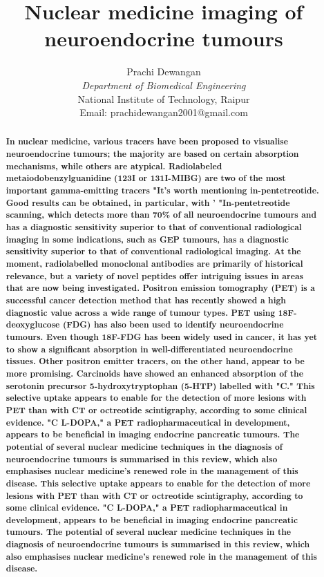 \documentclass{article}
\title{\textbf{Nuclear medicine imaging of neuroendocrine tumours}}
\author{Prachi Dewangan\\
\textit{Department of Biomedical Engineering} \\ National Institute of Technology, Raipur \\ Email: prachidewangan2001@gmail.com\\}
\date{}
\begin{document}
\maketitle
\begin{abstract}\textbf{In nuclear medicine, various tracers have been proposed to visualise neuroendocrine tumours; the majority are based on certain absorption mechanisms, while others are atypical. Radiolabeled metaiodobenzylguanidine (123I or 131I-MIBG) are two of the most important gamma-emitting tracers "It's worth mentioning in-pentetreotide. Good results can be obtained, in particular, with ' "In-pentetreotide scanning, which detects more than 70\% of all neuroendocrine tumours and has a diagnostic sensitivity superior to that of conventional radiological imaging in some indications, such as GEP tumours, has a diagnostic sensitivity superior to that of conventional radiological imaging. At the moment, radiolabelled monoclonal antibodies are primarily of historical relevance, but a variety of novel peptides offer intriguing issues in areas that are now being investigated. Positron emission tomography (PET) is a successful cancer detection method that has recently showed a high diagnostic value across a wide range of tumour types. PET using 18F-deoxyglucose (FDG) has also been used to identify neuroendocrine tumours. Even though 18F-FDG has been widely used in cancer, it has yet to show a significant absorption in well-differentiated neuroendocrine tissues. Other positron emitter tracers, on the other hand, appear to be more promising. Carcinoids have showed an enhanced absorption of the serotonin precursor 5-hydroxytryptophan (5-HTP) labelled with "C." This selective uptake appears to enable for the detection of more lesions with PET than with CT or octreotide scintigraphy, according to some clinical evidence. "C L-DOPA," a PET radiopharmaceutical in development, appears to be beneficial in imaging endocrine pancreatic tumours. The potential of several nuclear medicine techniques in the diagnosis of neuroendocrine tumours is summarised in this review, which also emphasises nuclear medicine's renewed role in the management of this disease. This selective uptake appears to enable for the detection of more lesions with PET than with CT or octreotide scintigraphy, according to some clinical evidence. "C L-DOPA," a PET radiopharmaceutical in development, appears to be beneficial in imaging endocrine pancreatic tumours. The potential of several nuclear medicine techniques in the diagnosis of neuroendocrine tumours is summarised in this review, which also emphasises nuclear medicine's renewed role in the management of this disease.
 } \\ \\
    
\end{abstract}
\end{document}
